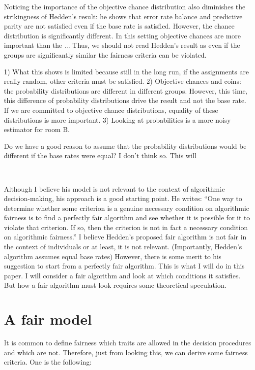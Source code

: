 \documentclass{article}
\begin{document}
Noticing the importance of the objective chance distribution also diminishes the strikingness of Hedden's result: he shows that error rate balance and predictive parity are not satisfied even if the base rate is satisfied. However, the chance distribution is significantly different. In this setting objective chances are more important than the ... Thus, we should not read Hedden's result as even if the groups are significantly similar the fairness criteria can be violated. 





1) What this shows is limited because still in the long run, if the assignments are really random, other criteria must be satisfied. 
2) Objective chances and coins: the probability distributions are different in different groups. However, this time, this difference of probability distributions drive the result and not the base rate. If we are committed to objective chance distributions, equality of these distributions is more important. 
3) Looking at probabilities is a more noisy estimator for room B. 

Do we have a good reason to assume that the probability distributions would be different if the base rates were equal? I don't think so. This will 


\




Although I believe his model is not relevant to the context of algorithmic decision-making, his approach is a good starting point. He writes: “One way to determine whether some criterion is a genuine necessary condition on algorithmic fairness is to find a perfectly fair algorithm and see whether it is possible for it to violate that criterion. If so, then the criterion is not in fact a necessary condition on algorithmic fairness.” I believe Hedden’s proposed fair algorithm is not fair in the context of individuals or at least, it is not relevant. (Importantly, Hedden’s algorithm assumes equal base rates) However, there is some merit to his suggestion to start from a perfectly fair algorithm. This is what I will do in this paper. I will consider a fair algorithm and look at which conditions it satisfies. But how a fair algorithm must look requires some theoretical speculation.


\section{A fair model}

It is common to define fairness which traits are allowed in the decision procedures and which are not. Therefore, just from looking this, we can derive some fairness criteria. One is the following: 
\end{document}

